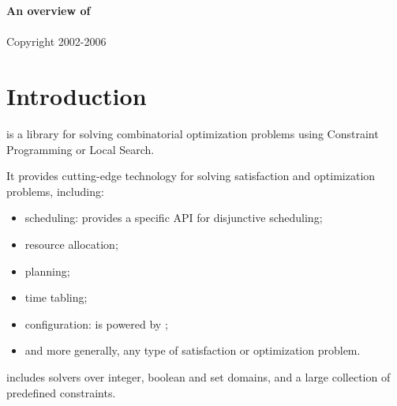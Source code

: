 \documentclass[twocolumn,a4paper,11pt]{article}
\begin{document}
\pagestyle{empty}
\onecolumn
\begin{center}
\ \\
\vspace{3cm} 
\ \\
\vspace{3cm} 
{\huge \bf An overview of\\ {\jcs}}
\ \\
\vspace{.5cm}
Copyright 2002-2006 \koalog
\ \\
\vspace{4cm}
\begin{minipage}{9cm}
\begin{small}
{\sunlegal}
{\ibmlegal}
{\mslegal}
{\linuxlegal}
\end{small}
\end{minipage}
\end{center}

\newpage
\twocolumn
\section*{\color{Blue}Introduction} 
{\jcs} is a {\java} library for solving combinatorial optimization problems 
using Constraint Programming or Local Search.

It provides cutting-edge technology for solving satisfaction and optimization problems, including:
\begin{itemize}
\item scheduling: {\jcs} provides a specific API for disjunctive scheduling;
\item resource allocation;
\item planning;
\item time tabling;
\item configuration: {\jcf} is powered by {\jcs};
\item and more generally, any type of satisfaction or optimization problem. 
\end{itemize}
{\jcs} includes solvers over integer, boolean and set domains, and a large
collection of predefined constraints.
\end{document}
